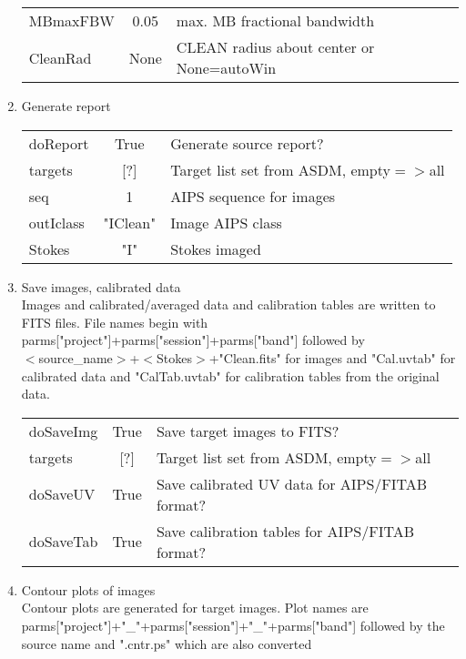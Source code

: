 \documentclass[11pt]{article}
\begin{document}
\begin{enumerate}
\begin{center}
\begin{tabular}{|l|c|l|}
MBmaxFBW    & 0.05     & max. MB fractional bandwidth\\
CleanRad    & None     & CLEAN radius about center or None=autoWin\\
\hline
\end{tabular}
\end{center}
%
\newpage
\item Generate report\\
\begin{center}
\begin{tabular}{|l|c|l|}
\hline
doReport    & True     & Generate source report? \\
targets     & [?]      & Target list set from ASDM, empty$=>$all\\
seq         & 1        & AIPS sequence for images \\
outIclass   & "IClean" & Image AIPS class\\
Stokes      & "I"      & Stokes imaged \\
\hline
\end{tabular}
\end{center}
%
\item Save images, calibrated data\\
Images and calibrated/averaged data and calibration tables are written
to FITS files.
File names begin with \\
parms["project"]+parms["session"]+parms["band"]
followed by \\
$<$source\_name$>$+$<$Stokes$>$+"Clean.fits" for images and
"Cal.uvtab" for calibrated data and "CalTab.uvtab" for calibration
tables from the original data.
\begin{center}
\begin{tabular}{|l|c|l|}
\hline
doSaveImg & True &  Save target images to FITS?\\
targets   & [?]  & Target list set from ASDM, empty$=>$all\\
doSaveUV  & True & Save calibrated UV data for AIPS/FITAB format? \\
doSaveTab & True &  Save calibration tables for AIPS/FITAB format?\\
\hline
\end{tabular}
\end{center}
%
\item Contour plots of images\\
Contour plots are generated for target images.
Plot names are \\
parms["project"]+"\_"+parms["session"]+"\_"+parms["band"]
followed by the source name and ".cntr.ps" which are also converted

\end{enumerate}
\end{document}
